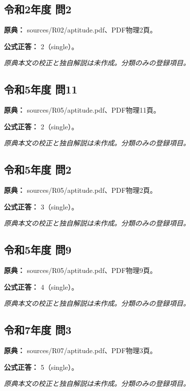 \subsection{令和2年度 問2}
\label{q:r02-reg-apt-02}

\noindent\textbf{原典：} sources/R02/aptitude.pdf、PDF物理2頁。

\textbf{公式正答：} 2（single）。

\par\textit{原典本文の校正と独自解説は未作成。分類のみの登録項目。}

\subsection{令和5年度 問11}
\label{q:r05-reg-apt-11}

\noindent\textbf{原典：} sources/R05/aptitude.pdf、PDF物理11頁。

\textbf{公式正答：} 2（single）。

\par\textit{原典本文の校正と独自解説は未作成。分類のみの登録項目。}

\subsection{令和5年度 問2}
\label{q:r05-reg-apt-02}

\noindent\textbf{原典：} sources/R05/aptitude.pdf、PDF物理2頁。

\textbf{公式正答：} 3（single）。

\par\textit{原典本文の校正と独自解説は未作成。分類のみの登録項目。}

\subsection{令和5年度 問9}
\label{q:r05-reg-apt-09}

\noindent\textbf{原典：} sources/R05/aptitude.pdf、PDF物理9頁。

\textbf{公式正答：} 4（single）。

\par\textit{原典本文の校正と独自解説は未作成。分類のみの登録項目。}

\subsection{令和7年度 問3}
\label{q:r07-reg-apt-03}

\noindent\textbf{原典：} sources/R07/aptitude.pdf、PDF物理3頁。

\textbf{公式正答：} 5（single）。

\par\textit{原典本文の校正と独自解説は未作成。分類のみの登録項目。}
